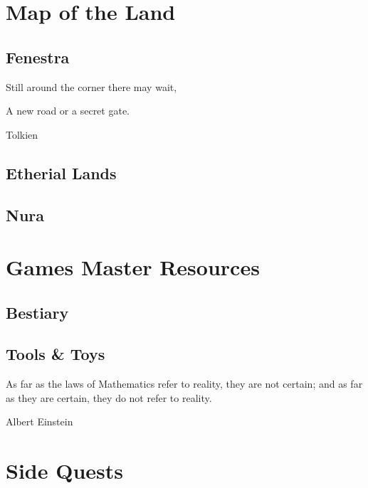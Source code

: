 \documentclass[a4paper,openany]{book}
\begin{document}

\tableofcontents

\pagebreak




\part{Map of the Land}

\chapter{Fenestra}
\epigraph{Still around the corner there may wait,

A new road or a secret gate.}{Tolkien}



\chapter{Etherial Lands}



\chapter{Nura}



\part{Games Master Resources}

\chapter{Bestiary}



\chapter{Tools \& Toys}

\epigraph{As far as the laws of Mathematics refer to reality, they are not certain; and as far as they are certain, they do not refer to reality.}{Albert Einstein}



\part{Side Quests}
\end{document}
